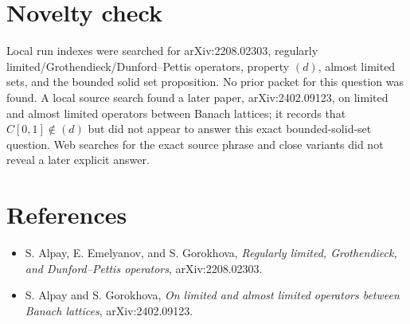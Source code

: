 \documentclass[11pt]{article}
\begin{document}
\section*{Novelty check}

Local run indexes were searched for arXiv:2208.02303, regularly
limited/Grothendieck/Dunford--Pettis operators, property \((d)\),
almost limited sets, and the bounded solid set proposition.  No prior
packet for this question was found.  A local source search found a later
paper, arXiv:2402.09123, on limited and almost limited operators between
Banach lattices; it records that \(C[0,1]\notin(d)\) but did not appear
to answer this exact bounded-solid-set question.  Web searches for the
exact source phrase and close variants did not reveal a later explicit
answer.

\section*{References}

\begin{itemize}
\item S. Alpay, E. Emelyanov, and S. Gorokhova, \emph{Regularly
limited, Grothendieck, and Dunford--Pettis operators},
arXiv:2208.02303.
\item S. Alpay and S. Gorokhova, \emph{On limited and almost limited
operators between Banach lattices}, arXiv:2402.09123.
\end{itemize}
\end{document}
